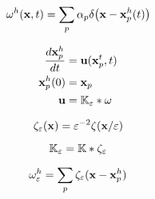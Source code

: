\begin{equation}
  \label{eq:point-vortex-method-approximation}
  \omega^h(\mathbf x, t) = \sum_p\alpha_p\delta\bigl(\mathbf x - \mathbf x_p^h(t)\bigr)
\end{equation}


\begin{align}
  \label{eq:vortex-blob-ode}
  \frac{d\mathbf x_p^h}{dt} &= \mathbf u(\mathbf x_p^t, t) \\
  \mathbf x_p^h(0) &= \mathbf x_p \\
  \mathbf u &= \mathbb{K}_\varepsilon * \omega
\end{align}

\begin{equation}
  \zeta_\varepsilon(\mathbf x) = \varepsilon^{-2}\zeta(\mathbf x/\varepsilon)
\end{equation}

\begin{equation}
  \mathbb{K}_\varepsilon = \mathbb{K} * \zeta_\varepsilon
\end{equation}

\begin{equation}
  \omega_\varepsilon^h = \sum_p\zeta_\varepsilon(\mathbf x - \mathbf x_p^h)
\end{equation}


